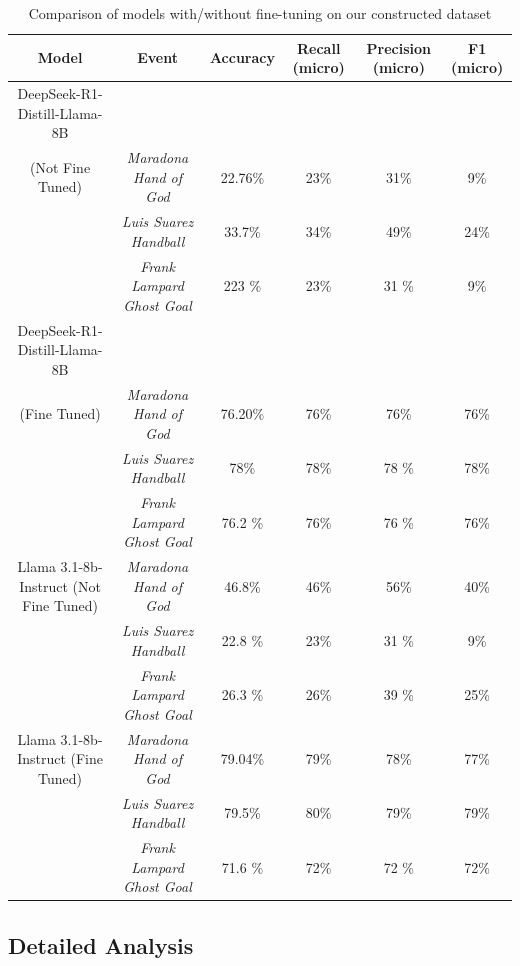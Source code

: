 \documentclass[sigconf, review]{acmart}
\begin{document}
\begin{table}[htbp]
    \centering
    \begin{tabular}{|c|c|c|c|c|c|}
        \hline
        \textbf{Model} & \textbf{Event} & \textbf{Accuracy} & \textbf{Recall (micro)} & \textbf{Precision (micro)} & \textbf{F1 (micro)} \\
         \hline
         DeepSeek-R1-Distill-Llama-8B \\ (Not Fine Tuned) & \textit{Maradona Hand of God} & 22.76\% & 23\% & 31\% & 9\% \\
         & \textit{Luis Suarez Handball} & 33.7\% & 34\% & 49\% & 24\% \\
         & \textit{Frank Lampard Ghost Goal} & 223 \% & 23\% & 31 \% & 9\% \\
          \hline
        DeepSeek-R1-Distill-Llama-8B \\ (Fine Tuned) & \textit{Maradona Hand of God} & 76.20\% & 76\% & 76\% & 76\% \\
         & \textit{Luis Suarez Handball} &  78\% & 78\% & 78 \% & 78\% \\
         & \textit{Frank Lampard Ghost Goal} & 76.2 \% & 76\% & 76 \% &76\% \\
         
        \hline
        Llama 3.1-8b-Instruct (Not Fine Tuned) & \textit{Maradona Hand of God} & 46.8\% & 46\% & 56\% & 40\% \\
         & \textit{Luis Suarez Handball} &  22.8 \% & 23\% & 31 \% & 9\% \\
         & \textit{Frank Lampard Ghost Goal} & 26.3 \% & 26\% & 39 \% & 25\% \\
         \hline
        Llama 3.1-8b-Instruct (Fine Tuned) & \textit{Maradona Hand of God} & 79.04\% & 79\% & 78\% & 77\% \\
         & \textit{Luis Suarez Handball} & 79.5\% & 80\% & 79\% & 79\% \\
         & \textit{Frank Lampard Ghost Goal} & 71.6 \% & 72\% & 72 \% & 72\% \\
        \hline
    \end{tabular}
    \caption{Comparison of models with/without fine-tuning on our constructed dataset}
    \label{tab:student_info}
\end{table}
\vspace{5mm}





\subsection{Detailed Analysis}
\end{document}

